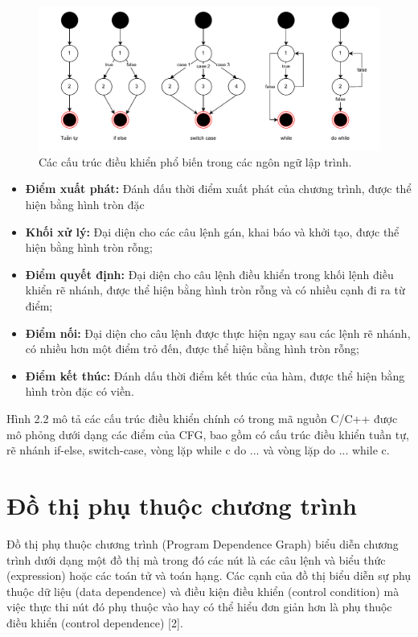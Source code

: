 \begin{figure}[H]
	\includegraphics[width=1\columnwidth]{figures/c2/c2_cfg_line.drawio.pdf}
	\centering
	\caption{Các cấu trúc điều khiển phổ biến trong các ngôn ngữ lập trình.}
	\label{img:background_cfg_line}
\end{figure}

\begin{itemize}
  \item \textbf{Điểm xuất phát:} Đánh dấu thời điểm xuất phát của chương trình, được thể hiện bằng
  hình tròn đặc
  \item \textbf{Khối xử lý:} Đại diện cho các câu lệnh gán, khai báo và khởi tạo, được thể hiện bằng
  hình tròn rỗng;
  \item \textbf{Điểm quyết định:} Đại diện cho câu lệnh điều khiển trong khối lệnh điều khiển rẽ
  nhánh, được thể hiện bằng hình tròn rỗng và có nhiều cạnh đi ra từ điểm;
  \item \textbf{Điểm nối:} Đại diện cho câu lệnh được thực hiện ngay sau các lệnh rẽ nhánh, có
  nhiều hơn một điểm trỏ đến, được thể hiện bằng hình tròn rỗng;
  \item \textbf{Điểm kết thúc:} Đánh dấu thời điểm kết thúc của hàm, được thể hiện bằng hình tròn
  đặc có viền.
\end{itemize}

Hình 2.2 mô tả các cấu trúc điều khiển chính có trong mã nguồn C/C++ được mô phỏng dưới dạng các điểm của CFG, bao gồm có cấu trúc điều khiển tuần tự, rẽ nhánh if-else, switch-case, vòng lặp while c do ... và vòng lặp do ... while c.

\section{Đồ thị phụ thuộc chương trình}

Đồ thị phụ thuộc chương trình (Program Dependence Graph) biểu diễn chương
trình dưới dạng một đồ thị mà trong đó các nút là các câu lệnh và biểu thức (expression)
hoặc các toán tử và toán hạng. Các cạnh của đồ thị biểu diễn sự phụ thuộc dữ liệu (data
dependence) và điều kiện điều khiển (control condition) mà việc thực thi nút đó phụ
thuộc vào hay có thể hiểu đơn giản hơn là phụ thuộc điều khiển (control dependence)
[2].

